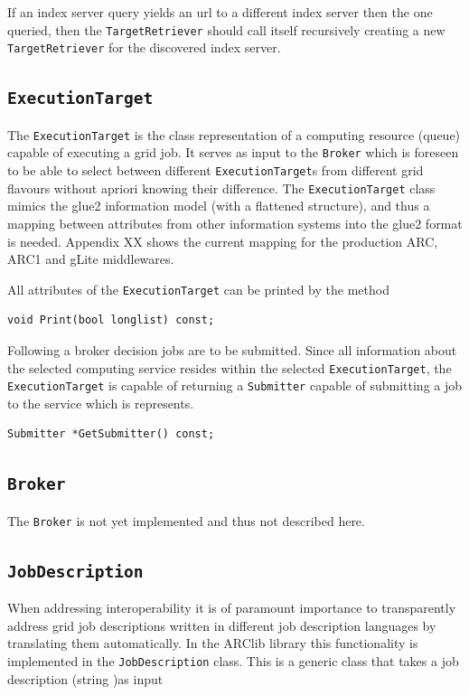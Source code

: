 \documentclass{book}
\newcommand{\TargetRetriever}{\texttt{TargetRetriever}}
\newcommand{\ExecutionTarget}{\texttt{ExecutionTarget}}
\newcommand{\Broker}{\texttt{Broker}}
\newcommand{\Submitter}{\texttt{Submitter}}
\newcommand{\JobDescription}{\texttt{JobDescription}}
\begin{document}
If an index server query yields an url to a different index server then the one queried, then the {\TargetRetriever} should 
call itself recursively creating a new {\TargetRetriever} for the discovered index server. 

\subsection{{\ExecutionTarget}} The {\ExecutionTarget} is the class representation of a computing resource (queue) capable of 
executing a grid job. It serves as input to the {\Broker} which is foreseen to be able to select between different 
{\ExecutionTarget}s from different grid flavours without apriori knowing their difference. The {\ExecutionTarget} class 
mimics the glue2 information model (with a flattened structure), and thus a mapping between attributes from other information 
systems into the glue2 format is needed.  Appendix XX shows the current mapping for the production ARC, ARC1 and gLite middlewares. 

All attributes of the {\ExecutionTarget} can be printed by the method

\begin{shaded}
\begin{verbatim}                                                                                                                            
void Print(bool longlist) const;
\end{verbatim}
\end{shaded}

Following a broker decision jobs are to be submitted. Since all information about the selected computing service resides within the 
selected {\ExecutionTarget}, the {\ExecutionTarget} is capable of returning a {\Submitter} capable of submitting a 
job to the service which is represents.

\begin{shaded}
\begin{verbatim}
Submitter *GetSubmitter() const;
\end{verbatim}
\end{shaded}

\subsection{{\Broker}} The {\Broker} is not yet implemented and thus not described here.

\subsection{{\JobDescription}} When addressing interoperability it is of paramount importance to transparently address grid job 
descriptions written in different job description languages by translating them automatically. In the ARClib library this functionality 
is implemented in the {\JobDescription} class. This is a generic class that takes a job description (string )as input 
\end{document}
